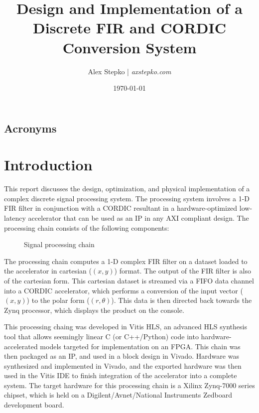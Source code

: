 \documentclass[11pt]{report}
\title{\Large\textbf{Design and Implementation of a Discrete FIR and CORDIC Conversion System}}
\author{Alex Stepko | \emph{axstepko.com}}
\affil{The Pennsylvania State University\\School of Electrical Engineering and Computer Science\\\normalsize{Zheyu Li, PhD. Candidate}}
\date{\today}
\begin{document}
\begin{titlepage}
    \maketitle
\end{titlepage}
\begin{singlespace}
    \tableofcontents
\end{singlespace}
\newpage
\section*{Acronyms}
\begin{multicols}{2}
    \raggedright
    \printacronyms[heading=none]
\end{multicols}
\listoffigures
\listoftables
\lstlistoflistings
\newpage

\chapter{Introduction}

This report discusses the design, optimization, and physical implementation of a complex discrete signal processing system. The processing system involves a 1-D \ac{FIR} filter in conjunction with a \ac{CORDIC} resultant in a hardware-optimized low-latency accelerator that can be used as an IP in any \ac{AXI} compliant design. The processing chain consists of the following components:
\begin{figure}[h!]
	\centering
	\fboxsep=3mm
	\caption{Signal processing chain}
	\label{processingChainGraph}
\end{figure}

The processing chain computes a 1-D complex FIR filter on a dataset loaded to the accelerator in cartesian ($(x, y)$) format. The output of the FIR filter is also of the cartesian form. This cartesian dataset is streamed via a FIFO data channel into a CORDIC accelerator, which performs a conversion of the input vector ($(x, y)$) to the polar form ($(r, \theta)$). This data is then directed back towards the Zynq processor, which displays the product on the console.

This processing chaing was developed in Vitis HLS, an advanced \ac{HLS} synthesis tool that allows seemingly linear C (or C++/Python) code into hardware-accelerated models targeted for implementation on an \ac{FPGA}. This chain was then packaged as an \ac{IP}, and used in a block design in Vivado. Hardware was synthesized and implemented in Vivado, and the exported hardware was then used in the Vitis \ac{IDE} to finish integration of the accelerator into a complete system. The target hardware for this processing chain is a Xilinx Zynq-7000 series chipset, which is held on a Digilent/Avnet/National Instruments Zedboard development board.
\end{document}
